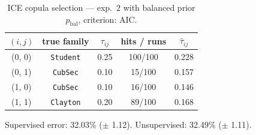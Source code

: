 \begin{table}[htbp]
  \centering
  \caption{ICE copula selection — exp.\ 2 with balanced prior $p_{\text{bal}}$, criterion: AIC.}
  \label{tab:exp3-exp2_bal_p__aic}
  \begin{tabular}{ccccc}
    \toprule
    $(i, j)$ & true family & $\tau_{ij}$ & hits / runs & $\hat\tau_{ij}$ \\
    \midrule
    (0, 0) & \texttt{Student} & 0.25 & 100/100 & 0.228 \\
    (0, 1) & \texttt{CubSec} & 0.10 & 15/100 & 0.157 \\
    (1, 0) & \texttt{CubSec} & 0.10 & 16/100 & 0.146 \\
    (1, 1) & \texttt{Clayton} & 0.20 & 89/100 & 0.168 \\
    \bottomrule
  \end{tabular}
  \par\smallskip Supervised error: 32.03\% ($\pm$ 1.12). Unsupervised: 32.49\% ($\pm$ 1.11).
\end{table}
